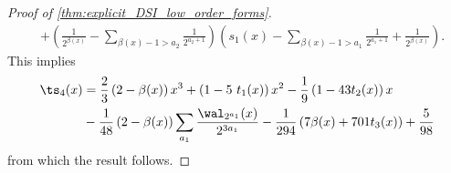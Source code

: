 \documentclass[acmsmall]{acmart}
\begin{document}
\begin{proof}[Proof of \cref{thm:explicit_DSI_low_order_forms}]
\begin{align*}
        &+ \left(\frac{1}{2^{\beta(x)}} - \sum_{\beta(x)-1 > a_2} \frac{1}{2^{a_2+1}}\right)\left(s_1(x) - \sum_{\beta(x)-1 > a_1} \frac{1}{2^{a_1+1}} + \frac{1}{2^{\beta(x)}}\right).
    \end{align*}
    This implies 
    \begin{align*}
        \ts_4(x) &=  \frac{2}{3}\left(2-\beta(x)\right)x^3 + \left(1-5\ t_1(x)\right)x^2 - \frac{1}{9} \left(1 - 43 t_2(x)\right)x \\
        &-\frac{1}{48} \left(2-\beta(x)\right)\sum_{a_1} \frac{\wal_{2^{a_1}}(x)}{2^{3a_1}} -\frac{1}{294} \left(7\beta(x)+701 t_3(x)\right) +\frac{5}{98}
    \end{align*}
    from which the result follows.
\end{proof}


\end{document}

